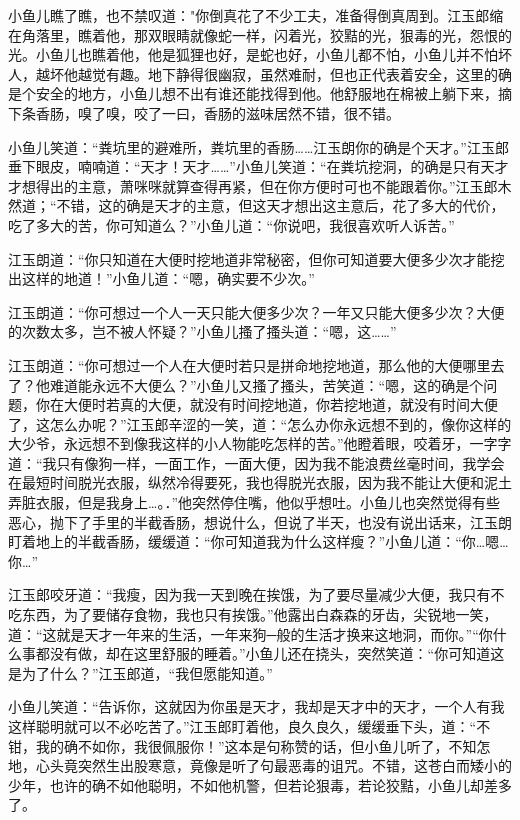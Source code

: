 \documentclass[12pt,oneside]{book}
\begin{document}
小鱼儿瞧了瞧，也不禁叹道："你倒真花了不少工夫，准备得倒真周到。江玉郎缩在角落里，瞧着他，那双眼睛就像蛇一样，闪着光，狡黠的光，狠毒的光，怨恨的光。小鱼儿也瞧着他，他是狐狸也好，是蛇也好，小鱼儿都不怕，小鱼儿并不怕坏人，越坏他越觉有趣。地下静得很幽寂，虽然难耐，但也正代表着安全，这里的确是个安全的地方，小鱼儿想不出有谁还能找得到他。他舒服地在棉被上躺下来，摘下条香肠，嗅了嗅，咬了一曰，香肠的滋味居然不错，很不错。

小鱼儿笑道：``粪坑里的避难所，粪坑里的香肠\ldots\ldots 江玉朗你的确是个天才。''江玉郎垂下眼皮，喃喃道：``天才！天才\ldots\ldots{}''小鱼儿笑道：``在粪坑挖洞，的确是只有天才才想得出的主意，萧咪咪就算查得再紧，但在你方便时可也不能跟着你。''江玉郎木然道；``不错，这的确是天才的主意，但这天才想出这主意后，花了多大的代价，吃了多大的苦，你可知道么？''小鱼儿道：``你说吧，我很喜欢听人诉苦。''

江玉朗道：``你只知道在大便时挖地道非常秘密，但你可知道要大便多少次才能挖出这样的地道！''小鱼儿道：``嗯，确实要不少次。''

江玉朗道：``你可想过一个人一天只能大便多少次？一年又只能大便多少次？大便的次数太多，岂不被人怀疑？''小鱼儿搔了搔头道：``嗯，这\ldots\ldots{}''

江玉朗道：``你可想过一个人在大便时若只是拼命地挖地道，那么他的大便哪里去了？他难道能永远不大便么？''小鱼儿又搔了搔头，苦笑道：``嗯，这的确是个问题，你在大便时若真的大便，就没有时间挖地道，你若挖地道，就没有时间大便了，这怎么办呢？''江玉郎辛涩的一笑，道：``怎么办你永远想不到的，像你这样的大少爷，永远想不到像我这样的小人物能吃怎样的苦。''他瞪着眼，咬着牙，一字字道：``我只有像狗一样，一面工作，一面大便，因为我不能浪费丝毫时间，我学会在最短时间脱光衣服，纵然冷得要死，我也得脱光衣服，因为我不能让大便和泥土弄脏衣服，但是我身上\ldots。．''他突然停住嘴，他似乎想吐。小鱼儿也突然觉得有些恶心，抛下了手里的半截香肠，想说什么，但说了半天，也没有说出话来，江玉朗盯着地上的半截香肠，缓缓道：``你可知道我为什么这样瘦？''小鱼儿道：``你\ldots 嗯\ldots 你\ldots{}''

江玉郎咬牙道：``我瘦，因为我一天到晚在挨饿，为了要尽量减少大便，我只有不吃东西，为了要储存食物，我也只有挨饿。''他露出白森森的牙齿，尖锐地一笑，道：``这就是天才一年来的生活，一年来狗─般的生活才换来这地洞，而你。''``你什么事都没有做，却在这里舒服的睡着。''小鱼儿还在挠头，突然笑道：``你可知道这是为了什么？''江玉郎道，``我但愿能知道。''

小鱼儿笑道：``告诉你，这就因为你虽是天才，我却是天才中的天才，一个人有我这样聪明就可以不必吃苦了。''江玉郎盯着他，良久良久，缓缓垂下头，道：``不钳，我的确不如你，我很佩服你！''这本是句称赞的话，但小鱼儿听了，不知怎地，心头竟突然生出股寒意，竟像是听了句最恶毒的诅咒。不错，这苍白而矮小的少年，也许的确不如他聪明，不如他机警，但若论狠毒，若论狡黠，小鱼儿却差多了。
\end{document}
